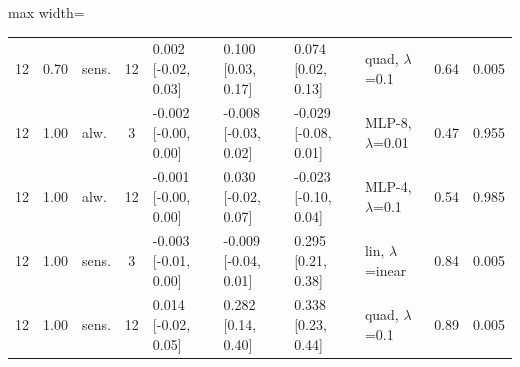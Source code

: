 \begin{table}[htbp]
\begin{adjustbox}{max width=\textwidth}
\begin{tabular}{cclc lll l cc}
12 & 0.70 & sens. & 12 & 0.002 [-0.02, 0.03] & 0.100 [0.03, 0.17] & 0.074 [0.02, 0.13] & quad, $\lambda$=0.1 & 0.64 & 0.005 \\
12 & 1.00 & alw. & 3 & -0.002 [-0.00, 0.00] & -0.008 [-0.03, 0.02] & -0.029 [-0.08, 0.01] & MLP-8, $\lambda$=0.01 & 0.47 & 0.955 \\
12 & 1.00 & alw. & 12 & -0.001 [-0.00, 0.00] & 0.030 [-0.02, 0.07] & -0.023 [-0.10, 0.04] & MLP-4, $\lambda$=0.1 & 0.54 & 0.985 \\
12 & 1.00 & sens. & 3 & -0.003 [-0.01, 0.00] & -0.009 [-0.04, 0.01] & 0.295 [0.21, 0.38] & lin, $\lambda$=inear & 0.84 & 0.005 \\
12 & 1.00 & sens. & 12 & 0.014 [-0.02, 0.05] & 0.282 [0.14, 0.40] & 0.338 [0.23, 0.44] & quad, $\lambda$=0.1 & 0.89 & 0.005 \\
\bottomrule
\end{tabular}
\end{adjustbox}
\end{table}